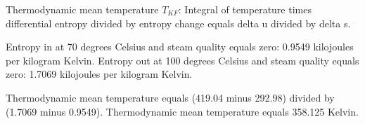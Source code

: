 Thermodynamic mean temperature \( T_{KF} \):  
Integral of temperature times differential entropy divided by entropy change equals delta u divided by delta s.  

Entropy in at 70 degrees Celsius and steam quality equals zero: 0.9549 kilojoules per kilogram Kelvin.  
Entropy out at 100 degrees Celsius and steam quality equals zero: 1.7069 kilojoules per kilogram Kelvin.  

Thermodynamic mean temperature equals (419.04 minus 292.98) divided by (1.7069 minus 0.9549).  
Thermodynamic mean temperature equals 358.125 Kelvin.